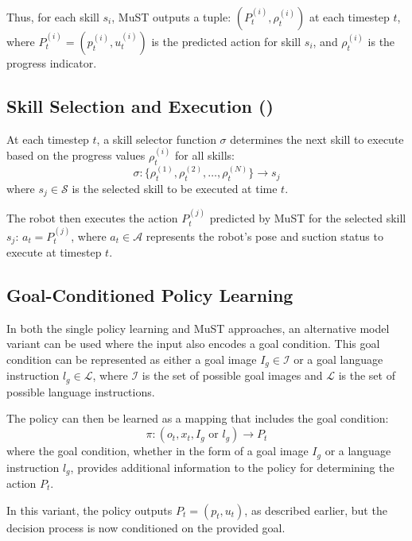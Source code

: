 Thus, for each skill \( s_i \), MuST outputs a tuple:
$(P_t^{(i)}, \rho_t^{(i)})$
at each timestep \( t \), where \( P_t^{(i)} = (p_t^{(i)}, u_t^{(i)}) \) is the predicted action for skill \( s_i \), and \( \rho_t^{(i)} \) is the progress indicator.

\subsection{Skill Selection and Execution (\progss)}

At each timestep \( t \), a skill selector function \( \sigma \) determines the next skill to execute based on the progress values \( \rho_t^{(i)} \) for all skills:
\[
\sigma: \{\rho_t^{(1)}, \rho_t^{(2)}, \dots, \rho_t^{(N)}\} \to s_j
\]
where \( s_j \in \mathcal{S} \) is the selected skill to be executed at time \( t \).

The robot then executes the action \( P_t^{(j)} \) predicted by MuST for the selected skill \( s_j \):
$a_t = P_t^{(j)}$,
where \( a_t \in \mathcal{A} \) represents the robot’s pose and suction status to execute at timestep \( t \).

\subsection{Goal-Conditioned Policy Learning}

In both the single policy learning and MuST approaches, an alternative model variant can be used where the input also encodes a goal condition. This goal condition can be represented as either a goal image \( I_g \in \mathcal{I} \) or a goal language instruction \( l_g \in \mathcal{L} \), where \( \mathcal{I} \) is the set of possible goal images and \( \mathcal{L} \) is the set of possible language instructions.

The policy can then be learned as a mapping that includes the goal condition:
\[
\pi : (o_t, x_t, I_g \text{ or } l_g) \to P_t
\]
where the goal condition, whether in the form of a goal image \( I_g \) or a language instruction \( l_g \), provides additional information to the policy for determining the action \( P_t \).

In this variant, the policy outputs \( P_t = (p_t, u_t) \), as described earlier, but the decision process is now conditioned on the provided goal.


